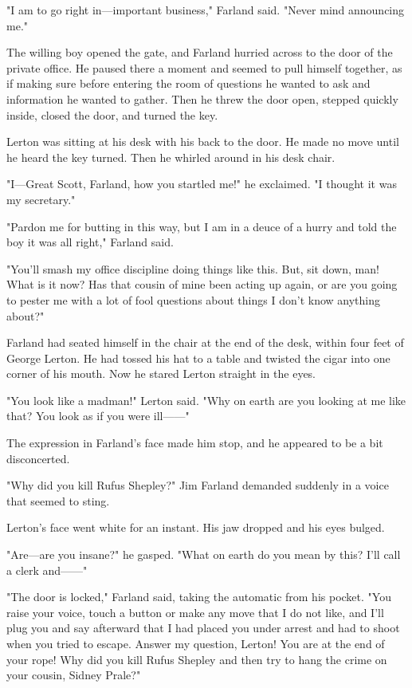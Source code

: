 \documentclass{novel}
\begin{document}
"I am to go right in---important business," Farland said. "Never mind announcing me."

The willing boy opened the gate, and Farland hurried across to the door of the private office. He paused there a moment and seemed to pull himself together, as if making sure before entering the room of questions he wanted to ask and information he wanted to gather. Then he threw the door open, stepped quickly inside, closed the door, and turned the key.

Lerton was sitting at his desk with his back to the door. He made no move until he heard the key turned. Then he whirled around in his desk chair.

"I---Great Scott, Farland, how you startled me!" he exclaimed. "I thought it was my secretary."

"Pardon me for butting in this way, but I am in a deuce of a hurry and told the boy it was all right," Farland said.

"You'll smash my office discipline doing things like this. But, sit down, man! What is it now? Has that cousin of mine been acting up again, or are you going to pester me with a lot of fool questions about things I don't know anything about?"

Farland had seated himself in the chair at the end of the desk, within four feet of George Lerton. He had tossed his hat to a table and twisted the cigar into one corner of his mouth. Now he stared Lerton straight in the eyes.

"You look like a madman!" Lerton said. "Why on earth are you looking at me like that? You look as if you were ill------"

The expression in Farland's face made him stop, and he appeared to be a bit disconcerted.

"Why did you kill Rufus Shepley?" Jim Farland demanded suddenly in a voice that seemed to sting.

Lerton's face went white for an instant. His jaw dropped and his eyes bulged.

"Are---are you insane?" he gasped. "What on earth do you mean by this? I'll call a clerk and------"

"The door is locked," Farland said, taking the automatic from his pocket. "You raise your voice, touch a button or make any move that I do not like, and I'll plug you and say afterward that I had placed you under arrest and had to shoot when you tried to escape. Answer my question, Lerton! You are at the end of your rope! Why did you kill Rufus Shepley and then try to hang the crime on your cousin, Sidney Prale?"
\end{document}
